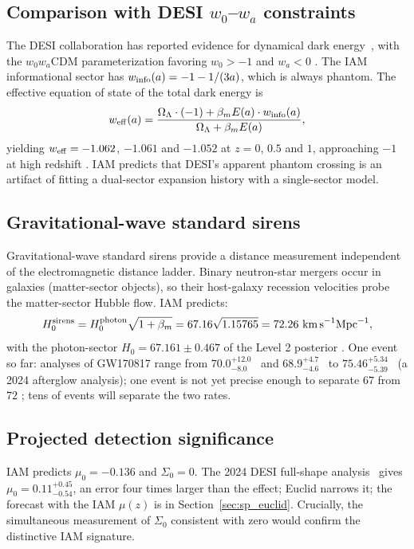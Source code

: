 \subsection{Comparison with DESI $w_0$--$w_a$ constraints}
The DESI collaboration has reported evidence for dynamical dark energy~\cite{DESI2025}, with the $w_0w_a$CDM parameterization favoring $w_0>-1$ and $w_a<0$
\observed. The IAM informational sector has $w_{\rm info}(a)=-1-1/(3a)$, which is always phantom. The effective equation of state of the total dark
energy is
\begin{equation}w_{\rm eff}(a)=\frac{\Omega_\Lambda\cdot(-1)+\beta_mE(a)\cdot w_{\rm info}(a)}{\Omega_\Lambda+\beta_mE(a)},\label{eq:th:weff2}\end{equation}
yielding $w_{\rm eff}=-1.062$, $-1.061$ and $-1.052$ at $z=0$, $0.5$ and $1$, approaching $-1$ at high redshift \calc. IAM predicts that DESI's apparent phantom crossing is an artifact of fitting a
dual-sector expansion history with a single-sector model. \prediction

\subsection{Gravitational-wave standard sirens}
Gravitational-wave standard sirens provide a distance measurement independent of the electromagnetic distance ladder. Binary neutron-star mergers
occur in galaxies (matter-sector objects), so their host-galaxy recession velocities probe the matter-sector Hubble flow. IAM predicts:
\begin{equation}H_0^{\rm sirens}=H_0^{\rm photon}\sqrt{1+\beta_m}=67.16\sqrt{1.15765}=72.26\ \text{km\,s}^{-1}\text{Mpc}^{-1},\label{eq:th:sirens}\end{equation}
with the photon-sector $H_0=67.161\pm0.467$ of the Level 2 posterior \calc. One event so far: analyses of GW170817 range from $70.0^{+12.0}_{-8.0}$~\cite{Abbott2017Siren}
and $68.9^{+4.7}_{-4.6}$~\cite{Hotokezaka2019} to $75.46^{+5.34}_{-5.39}$~\cite{Palmese2024} (a 2024 afterglow analysis); one event is not yet precise enough to separate $67$ from $72$ \observed; tens of events
will separate the two rates. \prediction

\subsection{Projected detection significance}
IAM predicts $\mu_0=-0.136$ and $\Sigma_0=0$. The 2024 DESI full-shape analysis~\cite{DESI2024VII} gives $\mu_0=0.11^{+0.45}_{-0.54}$, an error four times larger than the effect; Euclid narrows it; the forecast with the IAM $\mu(z)$ is in Section~\ref{sec:sp_euclid}.
Crucially, the simultaneous measurement of $\Sigma_0$ consistent with zero would confirm the distinctive IAM signature.

